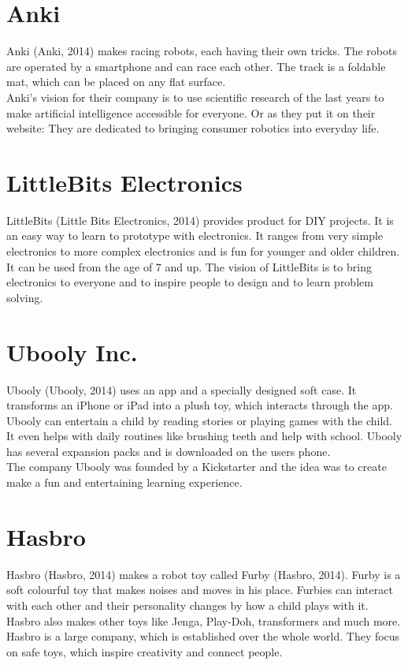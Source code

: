 \documentclass[11pt,twoside,a4paper]{report}
\begin{document}
\begin{appendices}
\section*{Anki}
Anki (Anki, 2014) makes racing robots, each having their own tricks. The robots are operated by a smartphone and can race each other. The track is a foldable mat, which can be placed on any flat surface. \\
Anki\rq{}s vision for their company is to use scientific research of the last years to make artificial intelligence accessible for everyone. Or as they put it on their website: They are dedicated to bringing consumer robotics into everyday life.
\section*{LittleBits Electronics}
LittleBits (Little Bits Electronics, 2014) provides product for DIY projects. It is an easy way to learn to prototype with electronics. It ranges from very simple electronics to more complex electronics and is fun for younger and older children. It can be used from the age of 7 and up. The vision of LittleBits is to bring electronics to everyone and to inspire people to design and to learn problem solving.
\section*{Ubooly Inc.}
Ubooly (Ubooly, 2014) uses an app and a specially designed soft case. It transforms an iPhone or iPad into a plush toy, which interacts through the app. Ubooly can entertain a child by reading stories or playing games with the child. It even helps with daily routines like brushing teeth and help with school. Ubooly has several expansion packs and is downloaded on the users phone. \\
The company Ubooly was founded by a Kickstarter and the idea was to create make a fun and entertaining learning experience.
\section*{Hasbro}
Hasbro (Hasbro, 2014) makes a robot toy called Furby (Hasbro, 2014). Furby is a soft colourful toy that makes noises and moves in his place. Furbies can interact with each other and their personality changes by how a child plays with it.\\
Hasbro also makes other toys like Jenga, Play-Doh, transformers and much more. Hasbro is a large company, which is established over the whole world. They focus on safe toys, which inspire creativity and connect people.

\end{appendices}
\end{document}
